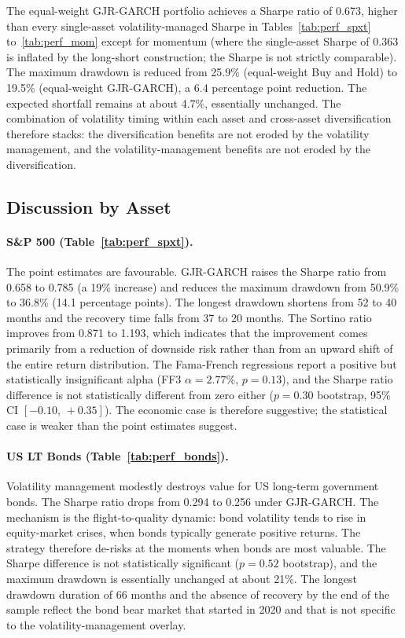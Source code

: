 \documentclass[12pt, a4paper]{article}
\begin{document}
The equal-weight GJR-GARCH portfolio achieves a Sharpe ratio of 0.673, higher than every
single-asset volatility-managed Sharpe in Tables~\ref{tab:perf_spxt}
to~\ref{tab:perf_mom} except for momentum (where the single-asset Sharpe of 0.363 is
inflated by the long-short construction; the Sharpe is not strictly comparable). The
maximum drawdown is reduced from 25.9\% (equal-weight Buy and Hold) to 19.5\% (equal-weight
GJR-GARCH), a 6.4 percentage point reduction. The expected shortfall remains at about
4.7\%, essentially unchanged. The combination of volatility timing within each asset and
cross-asset diversification therefore stacks: the diversification benefits are not
eroded by the volatility management, and the volatility-management benefits are not
eroded by the diversification.

\subsection{Discussion by Asset}

\paragraph{S\&P 500 (Table~\ref{tab:perf_spxt}).}
The point estimates are favourable. GJR-GARCH raises the Sharpe ratio from 0.658 to
0.785 (a 19\% increase) and reduces the maximum drawdown from 50.9\% to 36.8\% (14.1
percentage points). The longest drawdown shortens from 52 to 40 months and the recovery
time falls from 37 to 20 months. The Sortino ratio improves from 0.871 to 1.193, which
indicates that the improvement comes primarily from a reduction of downside risk rather
than from an upward shift of the entire return distribution. The Fama-French regressions
report a positive but statistically insignificant alpha (FF3 $\alpha = 2.77$\%,
$p = 0.13$), and the Sharpe ratio difference is not statistically different from zero
either ($p = 0.30$ bootstrap, 95\% CI $[-0.10,\,+0.35]$). The economic case is therefore
suggestive; the statistical case is weaker than the point estimates suggest.

\paragraph{US LT Bonds (Table~\ref{tab:perf_bonds}).}
Volatility management modestly destroys value for US long-term government bonds. The
Sharpe ratio drops from 0.294 to 0.256 under GJR-GARCH. The mechanism is the
flight-to-quality dynamic: bond volatility tends to rise in equity-market crises, when
bonds typically generate positive returns. The strategy therefore de-risks at the moments
when bonds are most valuable. The Sharpe difference is not statistically significant
($p = 0.52$ bootstrap), and the maximum drawdown is essentially unchanged at about 21\%.
The longest drawdown duration of 66 months and the absence of recovery by the end of the
sample reflect the bond bear market that started in 2020 and that is not specific to the
volatility-management overlay.
\end{document}
